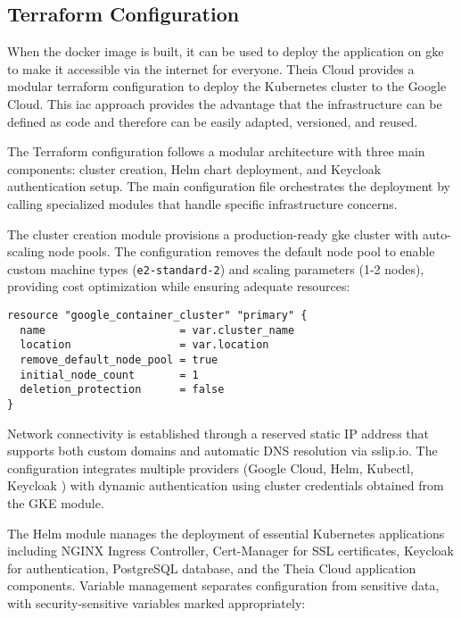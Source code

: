  \subsection{Terraform Configuration}
\label{subsec:terraform-configuration}

When the docker image is built, it can be used to deploy the application on \ac{gke} to make it accessible via the internet for everyone. Theia Cloud provides a modular terraform \cite{terraform-repo} configuration to deploy the Kubernetes cluster to the Google Cloud. This \ac{iac} approach provides the advantage that the infrastructure can be defined as code and therefore can be easily adapted, versioned, and reused.

The Terraform configuration follows a modular architecture with three main components: cluster creation, Helm chart deployment, and Keycloak \cite{keycloak-repo} authentication setup. The main configuration file orchestrates the deployment by calling specialized modules that handle specific infrastructure concerns.

The cluster creation module provisions a production-ready \ac{gke} cluster with auto-scaling node pools. The configuration removes the default node pool to enable custom machine types (\texttt{e2-standard-2}) and scaling parameters (1-2 nodes), providing cost optimization while ensuring adequate resources:

\begin{lstlisting}[language=hcl, caption=GKE Cluster Configuration]
resource "google_container_cluster" "primary" {
  name                     = var.cluster_name
  location                 = var.location
  remove_default_node_pool = true
  initial_node_count       = 1
  deletion_protection      = false
}
\end{lstlisting}

Network connectivity is established through a reserved static IP address that supports both custom domains and automatic DNS resolution via sslip.io. The configuration integrates multiple providers (Google Cloud, Helm, Kubectl, Keycloak \cite{keycloak-repo}) with dynamic authentication using cluster credentials obtained from the GKE module.

The Helm module manages the deployment of essential Kubernetes applications including NGINX Ingress Controller, Cert-Manager for SSL certificates, Keycloak \cite{keycloak-repo} for authentication, PostgreSQL database, and the Theia Cloud application components. Variable management separates configuration from sensitive data, with security-sensitive variables marked appropriately:

